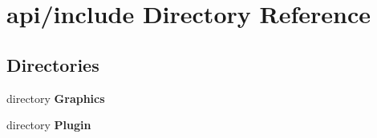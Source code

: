 \section{api/include Directory Reference}
\label{dir_cf4c4a12eb9d2821032e40f1ddeaaf89}
\subsection*{Directories}
\begin{DoxyCompactItemize}
\item 
directory {\bf Graphics}
\item 
directory {\bf Plugin}
\end{DoxyCompactItemize}
